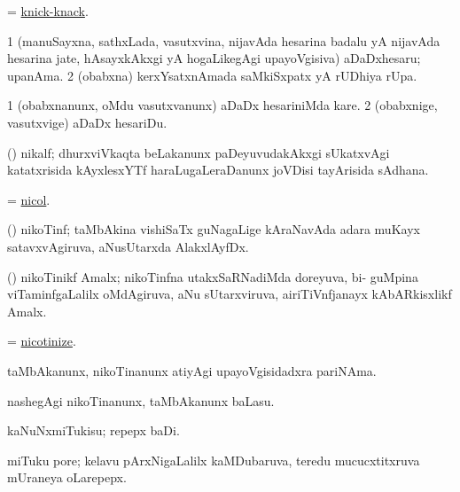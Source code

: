 \bentry
{}
\gl{\nA}
\bmng
= \hyperref{kandict_k.pdf}{K}{knick-knack}{knick-knack}. 
\emng
\eentry

\bentry
{}
\gl{\nA}
\bmng
\bnum
\num{1} (manuSayxna, sathxLada, vasutxvina, nijavAda hesarina badalu yA nijavAda hesarina jate, hAsayxkAkxgi yA hogaLikegAgi upayoVgisiva) aDaDxhesaru; upanAma. 
\num{2} (obabxna) kerxYsatxnAmada saMkiSxpatx yA rUDhiya rUpa. 
\enum
\emng
\eentry

\bentry
{}
\gl{\sakirx}
\bmng
\bnum
\num{1} (obabxnanunx, oMdu vasutxvanunx) aDaDx hesariniMda kare. 
\num{2} (obabxnige, vasutxvige) aDaDx hesariDu. 
\enum
\emng
\eentry

\bentry
{}
\gl{\nA}
\bmng
(\Bwvi) nikalf; dhurxviVkaqta beLakanunx paDeyuvudakAkxgi sUkatxvAgi katatxrisida kAyxlesxYTf haraLugaLeraDanunx joVDisi tayArisida sAdhana. 
\emng
\eentry

\bentry
{}
\gl{\nA}
\bmng
= \hyperlink{nicol}{nicol}. 
\emng
\eentry

\bentry
{}
\gl{\nA}
\bmng
(\ravi) nikoTinf; taMbAkina vishiSaTx guNagaLige kAraNavAda adara muKayx satavxvAgiruva,  aNusUtarxda AlakxlAyfDx. 
\emng
\eentry

\bentry
{}
\gl{\nA}
\bmng
(\ravi) nikoTinikf Amalx; nikoTinfna utakxSaRNadiMda doreyuva, bi- guMpina viTaminfgaLalilx oMdAgiruva,  aNu sUtarxviruva, airiTiVnfjanayx kAbARkisxlikf Amalx. 
\emng
\eentry

\bentry
{}
\bmng
= \hyperlink{nicotinize}{nicotinize}. 
\emng
\eentry

\bentry
{}
\gl{\nA}
\bmng
taMbAkanunx, nikoTinanunx atiyAgi upayoVgisidadxra pariNAma. 
\emng
\eentry

\bentry
{}
\gl{\sakirx}
\bmng
nashegAgi nikoTinanunx, taMbAkanunx baLasu. 
\emng
\eentry

\bentry
{}
\gl{\akirx}
\bmng
kaNuNxmiTukisu; repepx baDi. 
\emng

\noindent
\gl{\pagu}
\bmng
{} miTuku pore; kelavu pArxNigaLalilx kaMDubaruva, teredu mucucxtitxruva mUraneya oLarepepx. 
\emng
\eentry

